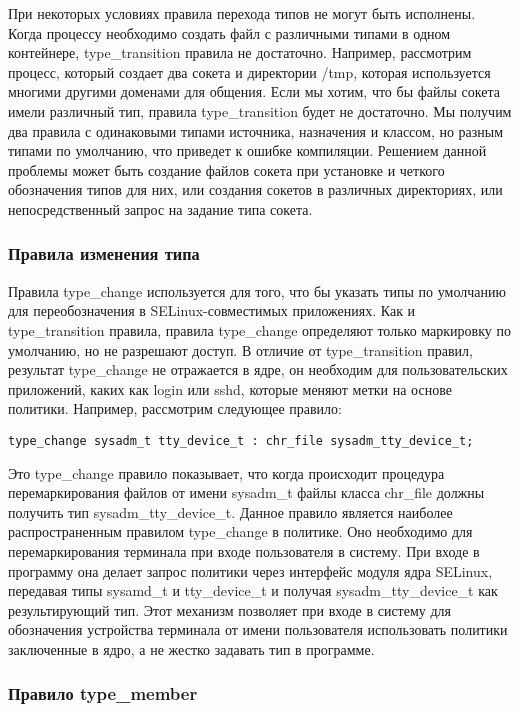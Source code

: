\documentclass{./../class/UIR}
\begin{document}
    При некоторых условиях правила перехода типов не могут быть исполнены. Когда
    процессу необходимо создать файл с различными типами в одном контейнере,
    type\_transition правила не достаточно. Например, рассмотрим процесс,
    который создает два сокета и директории /tmp, которая используется многими
    другими доменами для общения. Если мы хотим, что бы файлы сокета имели
    различный тип, правила type\_transition будет не достаточно. Мы получим два
    правила с одинаковыми типами источника, назначения и классом, но разным
    типами по умолчанию, что приведет к ошибке компиляции. Решением данной
    проблемы может быть создание файлов сокета при установке и четкого
    обозначения типов для них, или создания сокетов в различных директориях, или
    непосредственный запрос на задание типа сокета.

\subsubsection{Правила изменения типа}

    Правила type\_change используется для того, что бы указать типы по умолчанию
    для переобозначения в SELinux-совместимых приложениях. Как и
    type\_transition правила, правила type\_change определяют только маркировку
    по умолчанию, но не разрешают доступ. В отличие от type\_transition правил,
    результат type\_change не отражается в ядре, он необходим для
    пользовательских приложений, каких как login или sshd, которые меняют метки
    на основе политики. Например, рассмотрим следующее правило:
\begin{verbatim}
type_change sysadm_t tty_device_t : chr_file sysadm_tty_device_t;
\end{verbatim}
    Это type\_change правило показывает, что когда происходит процедура
    перемаркирования файлов от имени sysadm\_t файлы класса chr\_file должны
    получить тип sysadm\_tty\_device\_t. Данное правило является наиболее
    распространенным правилом type\_change в политике. Оно необходимо для
    перемаркирования терминала при входе пользователя в систему. При входе в
    программу она делает запрос политики через интерфейс модуля ядра SELinux,
    передавая типы sysamd\_t и tty\_device\_t и получая sysadm\_tty\_device\_t
    как результирующий тип. Этот механизм позволяет при входе в систему для
    обозначения устройства терминала от имени пользователя использовать политики
    заключенные в ядро, а не жестко задавать тип в программе.

\subsubsection{Правило type\_member}
\end{document}
